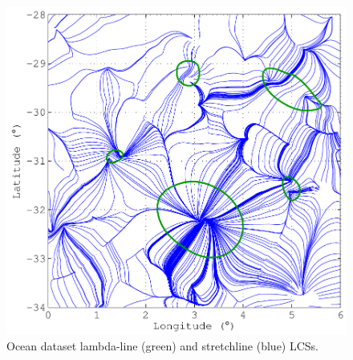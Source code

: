 \documentclass{article}
\begin{document}
\begin{figure}
\begin{center}
\includegraphics[width=\textwidth]{graphics/ocean_dataset/hyperbolic_shear_lcs_stretchline}
\end{center}
\caption{Ocean dataset lambda-line (green) and stretchline (blue) LCSs.}
\label{f:ocean dataset hyperbolic shear lcs stretchline}
\end{figure}
\end{document}
